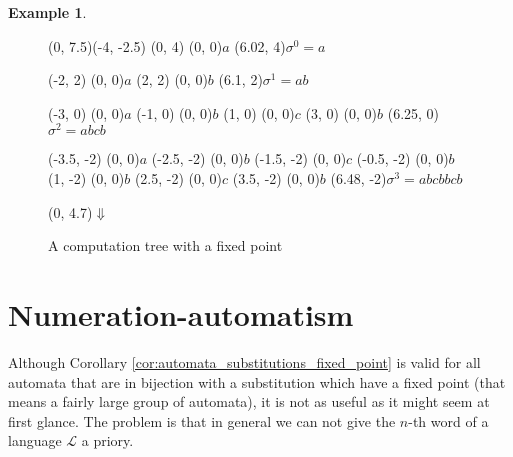 \documentclass{article}
\theoremstyle{definition}
\newtheorem{example}[theorem]{Example}
\begin{document}
\begin{example}
\begin{figure}[H]
\begin{graph}(0, 7.5)(-4, -2.5)
  (0, 4) (0, 0){$a$} %
  \freetext(6.02, 4){$\sigma^0 = a$}

  (-2, 2)  (0, 0){$a$} %
  (2, 2)  (0, 0){$b$}
  \freetext(6.1, 2){$\sigma^1 = ab$}

  (-3, 0)  (0, 0){$a$} %
  (-1, 0)  (0, 0){$b$}
  (1, 0)  (0, 0){$c$}
  (3, 0)  (0, 0){$b$}
  \freetext(6.25, 0){$\sigma^2 = abcb$}

  (-3.5, -2)  (0, 0){$a$} %
  (-2.5, -2)  (0, 0){$b$}
  (-1.5, -2) (0, 0){$c$}
  (-0.5, -2)  (0, 0){$b$}
  (1, -2)  (0, 0){$b$}
  (2.5, -2)  (0, 0){$c$}
  (3.5, -2)  (0, 0){$b$}
  \freetext(6.48, -2){$\sigma^3 = abcbbcb$}

   
   
  
   
   
   
   

   
   
   
   
   
   
   

  \freetext(0, 4.7){$\Downarrow$}
\end{graph}
\caption{A computation tree with a fixed point}
\label{fig:automata_tree_fixpoint_substitutions}
\end{figure}
\end{example}

\section{Numeration-automatism}
Although Corollary \ref{cor:automata_substitutions_fixed_point} is valid for 
all automata that are in bijection with a substitution which have a fixed point
(that means a fairly large group of automata), it is not as useful as it might 
seem at first glance. The problem is that in general we can not give the $n$-th
word of a language $\mathcal{L}$ a priory.
\end{document}
